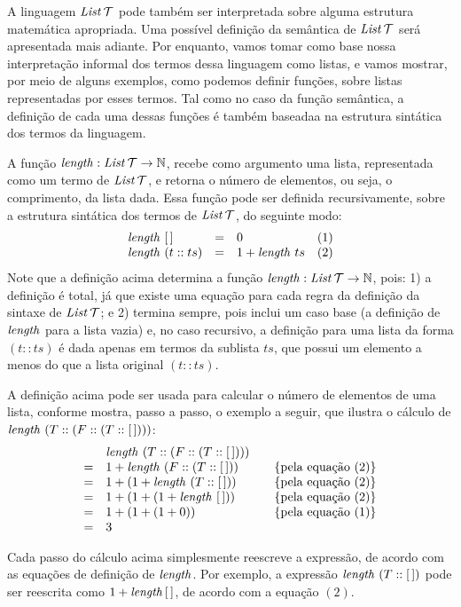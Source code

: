 A linguagem $\textit{List\/}\,\mathcal{T}$ pode também ser interpretada sobre alguma estrutura matemática apropriada. Uma possível definição da  semântica de $\textit{List\/}\,\mathcal{T}$ será  apresentada mais adiante. Por enquanto, vamos tomar como base nossa interpretação informal dos termos dessa linguagem como listas, e vamos mostrar, por meio de alguns exemplos, como podemos definir funções, sobre listas representadas por esses termos. Tal como no caso da função semântica, a definição de cada uma dessas funções é também baseadaa na estrutura sintática dos termos da linguagem.

\begin{Definition}
A função $\textit{length\/} : \textit{List\/}\,\mathcal{T} \rightarrow \mathbb{N}$, recebe como argumento uma lista, representada como um termo de $\textit{List\/}\,\mathcal{T}$, e retorna o número de elementos, ou seja, o comprimento, da lista dada. Essa função pode ser definida recursivamente, sobre a estrutura sintática dos termos de $\textit{List\/}\,\mathcal{T}$, do seguinte modo:
\[
\begin{array}{lclr}
  \textit{length\/}\,\,[\,] & = & 0 & (1)\\
  \textit{length\/}\,\,(t :: ts) & = & 1 + \textit{length\/}\,\, ts & (2)
\end{array}
\]
Note que a definição acima determina a função $\textit{length\/} : \textit{List\/}\,\mathcal{T} \rightarrow \mathbb{N}$, pois: 1) a definição \'e total, já que existe uma equação para cada regra da definição da sintaxe de $\textit{List\/}\,\mathcal{T}$; e 2) termina sempre, pois inclui um caso base (a definição de $\textit{length\/}$ para a lista vazia) e, no caso recursivo, a definição para uma lista da forma $(t :: ts)$ é dada apenas em termos da sublista $ts$, que possui um elemento a menos do que a lista original $(t::ts)$.
\end{Definition}

\begin{Example}
A definição acima pode ser usada para calcular o n\'umero de elementos de uma lista, conforme mostra, passo a passo, o exemplo a seguir, que ilustra o cálculo de $\textit{length\/}\,\,(T :: (F :: (T :: [\,])))$:
\[
\begin{array}{llcl}
& \length\,\,(T :: (F :: (T :: [\,]))) &  & \\
= &1 + \length\,\,(F :: (T :: [\,]))  & & \{\text{pela equa\c{c}\~ao }(2)\}\\
= &1 + (1 + \length\,\,(T :: [\,]))  &  & \{\text{pela equa\c{c}\~ao }(2)\}\\
= &1 + (1 + (1 + \length\,\,[\,]))  &  & \{\text{pela equa\c{c}\~ao }(2)\}\\
= &1 + (1 + (1 + 0))  &  & \{\text{pela equa\c{c}\~ao }(1)\}\\
= &3                  &   & 
\end{array}
\]
\end{Example}
Cada passo do cálculo acima simplesmente reescreve a express\~ao, de acordo com as equa\c{c}\~oes de definição de $\textit{length\/}$. Por exemplo, a expressão $\textit{length\/}\,\,(T :: [\,])$  pode ser reescrita como $1 + \textit{length\/}\, [\,]$, de acordo com a equa\c{c}\~ao $(2)$.

